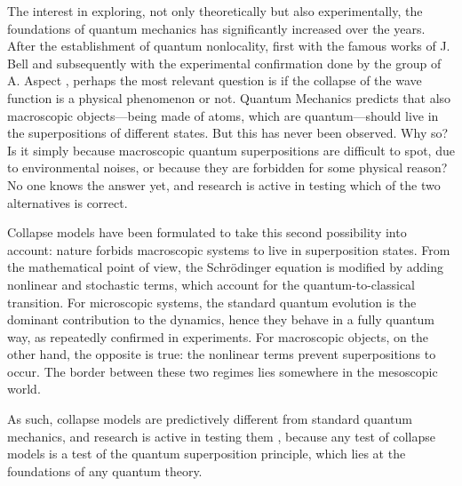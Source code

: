 \documentclass[12pt,groupedaddress,pra,aps]{revtex4-1}
\begin{document}
The interest in exploring, not only theoretically but also experimentally, the foundations of quantum mechanics has significantly increased over the years. After the establishment of quantum nonlocality, first with the famous works of J. Bell \cite{bell1964einstein,bell2004speakable} and subsequently with the experimental confirmation done by the group of A. Aspect \cite{PhysRevLett.47.460,PhysRevLett.49.91,PhysRevLett.49.1804}, perhaps the most relevant question is if the collapse of the wave function is a physical phenomenon or not. Quantum Mechanics predicts that also macroscopic objects---being made of atoms, which are quantum---should live in the superpositions of different states. But this has never been observed. Why so? Is it simply because macroscopic quantum superpositions are difficult to spot, due to environmental noises, or because they are forbidden for some physical reason? No one knows the answer yet, and research is active in testing which of the two alternatives is correct.

Collapse models \cite{Bassi2003257,RevModPhys.85.471} have been formulated to take this second possibility into account: nature forbids macroscopic systems to live in superposition states. From the mathematical point of view, the Schr\"odinger equation is modified by adding nonlinear and stochastic terms, which account for the quantum-to-classical transition. For microscopic systems, the standard  quantum evolution is the dominant contribution to the dynamics, hence they behave in a fully quantum way, as repeatedly confirmed in experiments. For macroscopic objects, on the other hand, the opposite is true: the nonlinear terms prevent superpositions to occur. The border between these two regimes lies somewhere in the mesoscopic world.

As such, collapse models are predictively different from standard quantum mechanics, and research is active in testing them \cite{RevModPhys.85.471}, because any test of collapse models is a test of the quantum superposition principle, which lies at the foundations of any quantum theory. 
\end{document}
